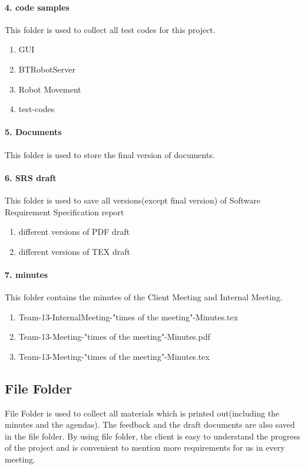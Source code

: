 \documentclass[11pt, a4paper]{report}
\begin{document}
\paragraph{4. code samples}
This folder is used to collect all test codes for this project.

\begin{enumerate}
	\item GUI
	\item BTRobotServer
	\item Robot Movement
	\item test-codes
\end{enumerate}

\paragraph{5. Documents}
This folder is used to store the final version of documents.
\paragraph{6. SRS draft}
This folder is used to save all versions(except final version) of Software Requirement Specification report 

\begin{enumerate}
	\item different versions of PDF draft
 	\item different versions of TEX draft 
\end{enumerate}

\paragraph{7. minutes}
This folder contains the minutes of the Client Meeting and Internal Meeting.
\begin{enumerate}
	\item Team-13-InternalMeeting-"times of the meeting"-Minutes.tex
	\item Team-13-Meeting-"times of the meeting"-Minutes.pdf
	\item Team-13-Meeting-"times of the meeting"-Minutes.tex
\end{enumerate}
\subsection{File Folder}
File Folder is used to collect all materials which is printed out(including the minutes and the agendas). The feedback and the draft documents are also saved in the file folder. By using file folder, the client is easy to understand the progress of the project and is convenient to mention more requirements for us in every meeting.
\end{document}
